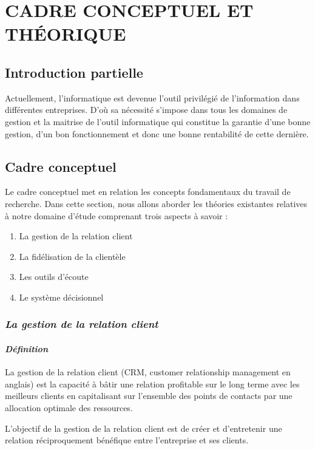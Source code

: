 \chapter[CADRE CONCEPTUEL ET THÉORIQUE]{CADRE CONCEPTUEL ET THÉORIQUE}    
    \section{Introduction partielle}
    Actuellement, l’informatique est devenue l’outil privilégié de l’information dans
    différentes entreprises. D’où sa nécessité s’impose dans tous les domaines de gestion et la
    maitrise de l’outil informatique qui constitue la garantie d’une bonne gestion, d’un bon
    fonctionnement et donc une bonne rentabilité de cette dernière.
    \section[Cadre Conceptuel]{Cadre conceptuel}
    Le cadre conceptuel met en relation les concepts
    fondamentaux du travail de recherche. Dans cette
    section, nous allons aborder les théories existantes
    relatives à notre domaine d’étude comprenant trois
    aspects à savoir :
    \par
        \begin{enumerate}
            \item La gestion de la relation client
            \item La fidélisation de la clientèle
            \item Les outils d’écoute
            \item Le système décisionnel
        \end{enumerate} 
        \subsection[La gestion de la relation client]{\textit{La gestion de la relation client}}
            \subsubsection[Définition]{\textit{Définition}}
            La gestion de la relation client (CRM, customer
            relationship management en anglais) est la capacité
            à bâtir une relation profitable sur le long terme
            avec les meilleurs clients en capitalisant sur 
            l’ensemble des points de contacts par une allocation optimale
            des ressources. \cite*{Lefebure2005}
            \par
            L’objectif de la gestion de la relation client
            est de créer et d’entretenir une relation réciproquement
            bénéfique entre l’entreprise et ses clients.
